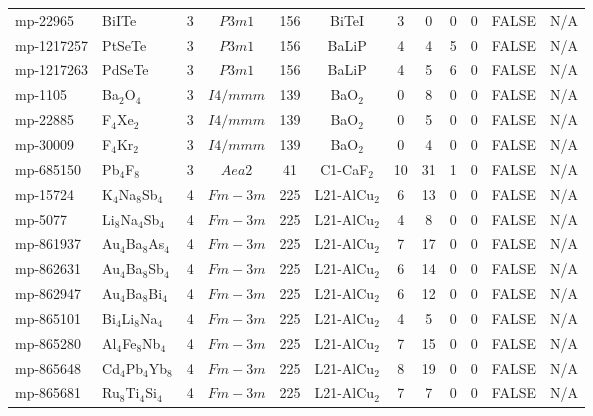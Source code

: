{\begin{longtable}{llcccccccccc}
    mp-22965 & BiITe & 3     & $P3m1$ & 156   & BiTeI & 3     & 0     & 0     & 0     & FALSE & N/A \\
    mp-1217257 & PtSeTe & 3     & $P3m1$ & 156   & BaLiP & 4     & 4     & 5     & 0     & FALSE & N/A \\
    mp-1217263 & PdSeTe & 3     & $P3m1$ & 156   & BaLiP & 4     & 5     & 6     & 0     & FALSE & N/A \\
    mp-1105 & Ba$_{2}$O$_{4}$ & 3     & $I4/mmm$ & 139   & BaO$_{2}$ & 0     & 8     & 0     & 0     & FALSE & N/A \\
    mp-22885 & F$_{4}$Xe$_{2}$ & 3     & $I4/mmm$ & 139   & BaO$_{2}$ & 0     & 5     & 0     & 0     & FALSE & N/A \\
    mp-30009 & F$_{4}$Kr$_{2}$ & 3     & $I4/mmm$ & 139   & BaO$_{2}$ & 0     & 4     & 0     & 0     & FALSE & N/A \\
    mp-685150 & Pb$_{4}$F$_{8}$ & 3     & $Aea2$ & 41    & C1-CaF$_{2}$ & 10    & 31    & 1     & 0     & FALSE & N/A \\
    mp-15724 & K$_{4}$Na$_{8}$Sb$_{4}$ & 4     & $Fm-3m$ & 225   & L21-AlCu$_{2}$ & 6     & 13    & 0     & 0     & FALSE & N/A \\
    mp-5077 & Li$_{8}$Na$_{4}$Sb$_{4}$ & 4     & $Fm-3m$ & 225   & L21-AlCu$_{2}$ & 4     & 8     & 0     & 0     & FALSE & N/A \\
    mp-861937 & Au$_{4}$Ba$_{8}$As$_{4}$ & 4     & $Fm-3m$ & 225   & L21-AlCu$_{2}$ & 7     & 17    & 0     & 0     & FALSE & N/A \\
    mp-862631 & Au$_{4}$Ba$_{8}$Sb$_{4}$ & 4     & $Fm-3m$ & 225   & L21-AlCu$_{2}$ & 6     & 14    & 0     & 0     & FALSE & N/A \\
    mp-862947 & Au$_{4}$Ba$_{8}$Bi$_{4}$ & 4     & $Fm-3m$ & 225   & L21-AlCu$_{2}$ & 6     & 12    & 0     & 0     & FALSE & N/A \\
    mp-865101 & Bi$_{4}$Li$_{8}$Na$_{4}$ & 4     & $Fm-3m$ & 225   & L21-AlCu$_{2}$ & 4     & 5     & 0     & 0     & FALSE & N/A \\
    mp-865280 & Al$_{4}$Fe$_{8}$Nb$_{4}$ & 4     & $Fm-3m$ & 225   & L21-AlCu$_{2}$ & 7     & 15    & 0     & 0     & FALSE & N/A \\
    mp-865648 & Cd$_{4}$Pb$_{4}$Yb$_{8}$ & 4     & $Fm-3m$ & 225   & L21-AlCu$_{2}$ & 8     & 19    & 0     & 0     & FALSE & N/A \\
    mp-865681 & Ru$_{8}$Ti$_{4}$Si$_{4}$ & 4     & $Fm-3m$ & 225   & L21-AlCu$_{2}$ & 7     & 7     & 0     & 0     & FALSE & N/A \\

\end{longtable}}

